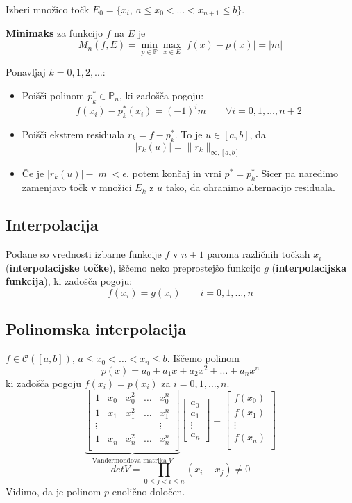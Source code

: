 \begin{multicols}{5}
Izberi množico točk $E_0 = \{ x_i,\ a \leq x_0 < \dots < x_{n+1} \leq b \}$.

\textbf{Minimaks} za funkcijo $f$ na $E$ je
\[M_n(f, E) = \min_{p \in \mathbb{P}} \max_{x \in E} | f(x) - p(x) | = |m|\]

Ponavljaj $k = 0, 1, 2, \dots$:
\begin{itemize}
    \item Poišči polinom $p_k^* \in \mathbb{P}_n$, ki zadošča pogoju:
    \[ f(x_i) - p_k^*(x_i) = (-1)^i m \qquad \forall i = 0, 1, \dots, n+2 \]
    \item Poišči ekstrem residuala $r_k = f - p_k^*$. To je $u \in [a,b]$, da
    \[ |r_k(u)| = \| r_k \|_{\infty, [a,b]} \]
    \item Če je $|r_k(u)| - |m| < \epsilon$, potem končaj in vrni $p^* = p_k^*$. 
    Sicer pa naredimo zamenjavo točk v množici $E_k$ z $u$ tako, da ohranimo alternacijo residuala.
\end{itemize}

\subsection*{Interpolacija}
Podane so vrednosti izbarne funkcije $f$ v $n+1$ paroma različnih točkah $x_i$ (\textbf{interpolacijske točke}),
iščemo neko preprostejšo funkcijo $g$ (\textbf{interpolacijska funkcija}), ki zadošča pogoju:
\[ f(x_i) = g(x_i) \qquad i = 0, 1, \dots, n \]

\subsection*{Polinomska interpolacija}
$f \in \mathcal{C}([a,b])$, $a \leq x_0 < \dots < x_n \leq b$. Iščemo polinom
\[ p(x) = a_0 + a_1 x + a_2 x^2 + \dots + a_n x^n \]
ki zadošča pogoju $f(x_i) = p(x_i)$ za $i = 0, 1, \dots, n$. 
\[
\underbrace{\begin{bmatrix}
    1 & x_0 & x_0^2 & \dots & x_0^n \\
    1 & x_1 & x_1^2 & \dots & x_1^n \\
    \vdots & &        &       & \vdots \\
    1 & x_n & x_n^2 & \dots & x_n^n \\
\end{bmatrix}}_{\text{Vandermondova matrika $V$}}
\begin{bmatrix}
    a_0 \\
    a_1 \\
    \vdots \\
    a_n
\end{bmatrix}
=
\begin{bmatrix}
    f(x_0) \\
    f(x_1) \\
    \vdots \\
    f(x_n) \\
\end{bmatrix}
\]
\[ det V = \prod_{0 \leq j < i \leq n} (x_i - x_j) \neq 0\]
Vidimo, da je polinom $p$ enolično določen.


\end{multicols}
